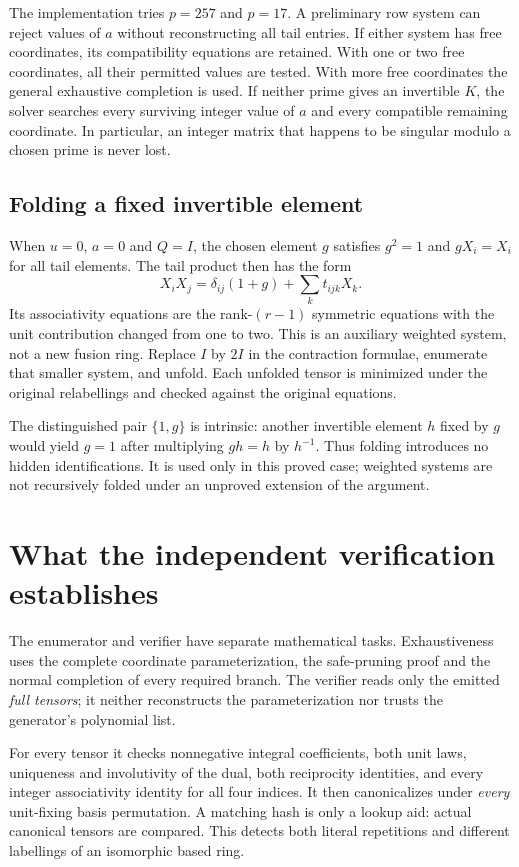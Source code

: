 \documentclass[11pt,a4paper]{article}
\theoremstyle{definition}\newtheorem{definition}[theorem]{Definition}\newtheorem{remark}[theorem]{Remark}
\begin{document}
The implementation tries $p=257$ and $p=17$. A preliminary row system can
reject values of $a$ without reconstructing all tail entries. If either system
has free coordinates, its compatibility equations are retained. With one or
two free coordinates, all their permitted values are tested. With more free
coordinates the general exhaustive completion is used. If neither prime gives
an invertible $K$, the solver searches every surviving integer value of $a$
and every compatible remaining coordinate. In particular, an integer matrix
that happens to be singular modulo a chosen prime is never lost.

\subsection{Folding a fixed invertible element}
When $u=0$, $a=0$ and $Q=I$, the chosen element $g$ satisfies $g^2=1$ and
$gX_i=X_i$ for all tail elements. The tail product then has the form
\[
 X_iX_j=\delta_{ij}(1+g)+\sum_k t_{ijk}X_k.
\]
Its associativity equations are the rank-$(r-1)$ symmetric equations with the
unit contribution changed from one to two. This is an auxiliary weighted
system, not a new fusion ring. Replace $I$ by $2I$ in the contraction formulae,
enumerate that smaller system, and unfold. Each unfolded tensor is minimized
under the original relabellings and checked against the original equations.

The distinguished pair $\{1,g\}$ is intrinsic: another invertible element
$h$ fixed by $g$ would yield $g=1$ after multiplying $gh=h$ by $h^{-1}$.
Thus folding introduces no hidden identifications. It is used only in this
proved case; weighted systems are not recursively folded under an unproved
extension of the argument.

\section{What the independent verification establishes}
The enumerator and verifier have separate mathematical tasks. Exhaustiveness
uses the complete coordinate parameterization, the safe-pruning proof and the
normal completion of every required branch. The verifier reads only the emitted
\emph{full tensors}; it neither reconstructs the parameterization nor trusts the
generator's polynomial list.

For every tensor it checks nonnegative integral coefficients, both unit laws,
uniqueness and involutivity of the dual, both reciprocity identities, and every
integer associativity identity for all four indices. It then canonicalizes
under \emph{every} unit-fixing basis permutation. A matching hash is only a
lookup aid: actual canonical tensors are compared. This detects both literal
repetitions and different labellings of an isomorphic based ring.
\end{document}
